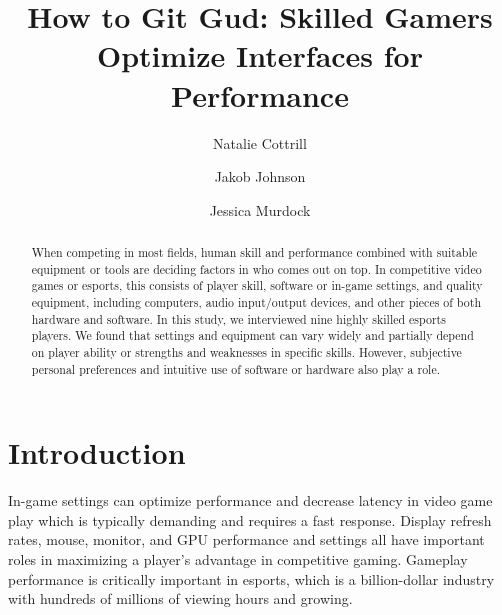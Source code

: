 \documentclass[11pt,manuscript,screen,review]{acmart} %
\begin{document}
\title{How to Git Gud: Skilled Gamers Optimize Interfaces for Performance}

\author{Natalie Cottrill}

\author{Jakob Johnson}

\author{Jessica Murdock}

\begin{abstract}
When competing in most fields, human skill and performance combined with suitable equipment or tools are deciding factors in who comes out on top. In competitive video games or esports, this consists of player skill, software or in-game settings, and quality equipment, including computers, audio input/output devices, and other pieces of both hardware and software. In this study, we interviewed nine highly skilled esports players. We found that settings and equipment can vary widely and partially depend on player ability or strengths and weaknesses in specific skills. However, subjective personal preferences and intuitive use of software or hardware also play a role.
\end{abstract}


\maketitle

\section{Introduction}
In-game settings can optimize performance and decrease latency in video game play \cite{Liu2021} which is typically demanding and requires a fast response. Display refresh rates, mouse, monitor, and GPU performance and settings all have important roles in maximizing a player's advantage in competitive gaming. Gameplay performance is critically important in esports, which is a billion-dollar industry \cite{ayles2019} with hundreds of millions of viewing hours and growing. 
\end{document}
